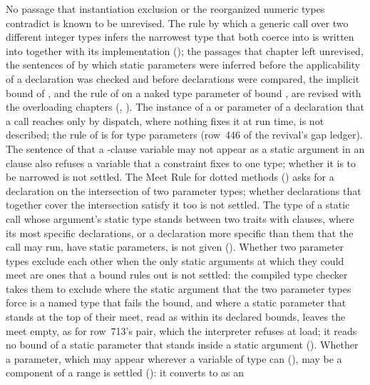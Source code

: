 No passage that instantiation exclusion or the reorganized numeric types
contradict is known to be unrevised.
The rule by which a generic call over two different integer types
infers the narrowest type that both coerce into is written into
 together with its implementation
(); the passages that chapter left unrevised, the
sentences of  by which static parameters were
inferred before the applicability of a declaration was checked and before
declarations were compared, the implicit bound of , and the
rule of  on a naked type parameter of bound
, are revised with the overloading chapters (,
).
The instance of a  or  parameter of a declaration that a call
reaches only by dispatch, where nothing fixes it at run time, is not described;
the rule of  is for type parameters (row~446 of the
revival's gap ledger).
The sentence of  that a -clause variable may
not appear as a static argument in an  clause also refuses a
variable that a constraint fixes to one type; whether it is to be narrowed is
not settled.
The Meet Rule for dotted methods () asks for a
declaration on the intersection of two parameter types; whether declarations
that together cover the intersection satisfy it too is not settled.
The type of a static call whose argument's static type stands between two
traits with  clauses, where its most specific declarations, or a
declaration more specific than them that the call may run, have static
parameters, is not given ().
Whether two parameter types exclude each other when the only static arguments
at which they could meet are ones that a bound rules out is not settled: the
compiled type checker takes them to exclude where the static argument that the
two parameter types force is a named type that fails the bound, and where a
static parameter that stands at the top of their meet, read as within its
declared bounds, leaves the meet empty, as for row~713's pair, which the
interpreter refuses at load; it reads no bound of a static parameter that
stands inside a static argument ().
Whether a  parameter, which may appear wherever a variable of type
 can (), may be a component of a range is
settled (): it converts to  as an
